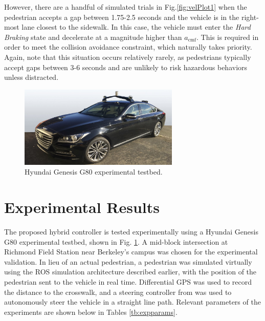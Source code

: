 \documentclass[letterpaper, 10 pt, conference]{ieeeconf}  %
\begin{document}
However, there are a handful of simulated trials in Fig.\ref{fig:velPlot1} when the pedestrian accepts a gap between 1.75-2.5 seconds and the vehicle is in the right-most lane closest to the sidewalk. In this case, the vehicle must enter the \textit{Hard Braking} state and decelerate at a magnitude higher than $a_\mathrm{cmf}$. This is required in order to meet the collision avoidance constraint, which naturally takes priority. Again, note that this situation occurs relatively rarely, as pedestrians typically accept gaps between 3-6 seconds and are unlikely to risk hazardous behaviors unless distracted. 

\begin{figure}[h]
\centering
\includegraphics[width=3.0in]{figures/G80.jpg}
\caption{Hyundai Genesis G80 experimental testbed.}
\label{fig:g80}
\end{figure}


\section{Experimental Results}
\label{sec:expres}


The proposed hybrid controller is tested experimentally using a Hyundai Genesis G80 experimental testbed, shown in Fig. \ref{fig:g80}. A mid-block intersection at Richmond Field Station near Berkeley's campus was chosen for the experimental validation.  In lieu of an actual pedestrian, a pedestrian was simulated virtually using the ROS simulation architecture described earlier, with the position of the pedestrian sent to the vehicle in real time. Differential GPS was used to record the distance to the crosswalk, and a steering controller from \cite{kapania} was used to autonomously steer the vehicle in a straight line path. Relevant parameters of the experiments are shown below in Tables \ref{tb:expparams}.
\end{document}
